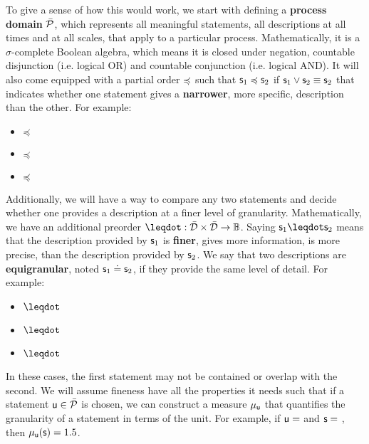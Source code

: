 \documentclass[10pt, onecolumn, longbibliography, nofootinbib]{revtex4-2}
\begin{document}
To give a sense of how this would work, we start with defining a \textbf{process domain} $\tdomain[P]$, which represents all meaningful statements, all descriptions at all times and at all scales, that apply to a particular process. Mathematically, it is a $\sigma$-complete Boolean algebra, which means it is closed under negation, countable disjunction (i.e. logical OR) and countable conjunction (i.e. logical AND). It will also come equipped with a partial order $\narrower$ such that $\stmt_1 \narrower \stmt_2$ if $\stmt_1 \OR \stmt_2 \equiv \stmt_2$ that indicates whether one statement gives a \textbf{narrower}, more specific, description than the other. For example:
\begin{itemize}
    \item {} $\narrower$ 
    \item {} $\narrower$ 
    \item {} $\narrower$ 
\end{itemize}

Additionally, we will have a way to compare any two statements and decide whether one provides a description at a finer level of granularity. Mathematically, we have an additional preorder $\finer : \tdomain \times \tdomain \to \mathbb{B}$. Saying $\stmt_1 \finer \stmt_2$ means that the description provided by $\stmt_1$ is \textbf{finer}, gives more information, is more precise, than the description provided by $\stmt_2$. We say that two descriptions are \textbf{equigranular}, noted $\stmt_1 \eqgran \stmt_2$, if they provide the same level of detail. For example:
\begin{itemize}
    \item {} $\finer$ 
    \item {} $\finer$ 
    \item {} $\finer$ 
\end{itemize}
In these cases, the first statement may not be contained or overlap with the second. We will assume fineness have all the properties it needs such that if a statement $\stmt[u] \in \tdomain[P]$ is chosen, we can construct a measure $\mu_{\stmt[u]}$ that quantifies the granularity of a statement in terms of the unit. For example, if $\stmt[u]=$  and $\stmt=$ , then $\mu_{\stmt[u]}(\stmt) = 1.5$.
\end{document}
